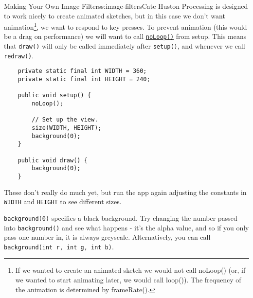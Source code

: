 \begin{aosachapter}{Making Your Own Image Filters}{s:image-filters}{Cate Huston}
Processing is designed to work nicely to create animated sketches, but
in this case we don't want animation\footnote{If we wanted to create an
  animated sketch we would not call noLoop() (or, if we wanted to start
  animating later, we would call loop()). The frequency of the animation
  is determined by frameRate().}, we want to respond to key presses. To
prevent animation (this would be a drag on performance) we will want to
call
\href{http://www.processing.org/reference/noLoop_.html}{\texttt{noLoop()}}
from setup. This means that \texttt{draw()} will only be called
immediately after \texttt{setup()}, and whenever we call
\texttt{redraw()}.

\begin{verbatim}
    private static final int WIDTH = 360;
    private static final int HEIGHT = 240;

    public void setup() {
        noLoop();

        // Set up the view.
        size(WIDTH, HEIGHT);
        background(0);
    }
        
    public void draw() {
        background(0);
    }
\end{verbatim}

These don't really do much yet, but run the app again adjusting the
constants in \texttt{WIDTH} and \texttt{HEIGHT} to see different sizes.

\texttt{background(0)} specifies a black background. Try changing the
number passed into \texttt{background()} and see what happens - it's the
alpha value, and so if you only pass one number in, it is always
greyscale. Alternatively, you can call
\texttt{background(int r, int g, int b)}.

\end{aosachapter}
